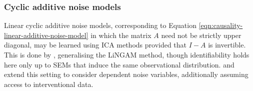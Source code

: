 


\subsubsection{Cyclic additive noise models}\label{subsubsec:causality-causal-inference-cyclic}

Linear cyclic additive noise models, corresponding to Equation \ref{eqn:causality-linear-additive-noise-model} in which the matrix $A$ need not be strictly upper diagonal, may be learned using ICA methods provided that $I-A$ is invertible.
This is done by \cite{lacerda2012discovering}, generalising the LiNGAM method, though identifiability holds here only up to SEMs that induce the same observational distribution.
\cite{scheines2010combining, hyttinen2010causal, hyttinen2012learning} and \cite{hyttinen2013discovering} extend this setting to consider dependent noise variables, additionally assuming access to interventional data.


